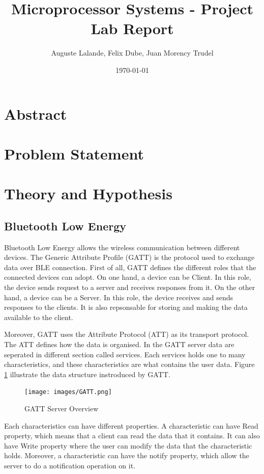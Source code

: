 \documentclass[12pt]{article}
\title{Microprocessor Systems - Project Lab Report}
\author{Auguste Lalande, Felix Dube, Juan Morency Trudel}
\date{\today}
\begin{document}
\maketitle
\clearpage

\tableofcontents
\clearpage

\section{Abstract}

\section{Problem Statement}

\section{Theory and Hypothesis}
\subsection{Bluetooth Low Energy}
Bluetooth Low Energy allows the wireless communication between different devices. The Generic Attribute Profile (GATT) is the protocol used to exchange data over BLE connection. First of all, GATT defines the different roles that the connected devices can adopt. On one hand, a device can be Client. In this role, the device sends request to a server and receives responses from it. On the other hand, a device can be a Server. In this role, the device receives and sends responses to the clients. It is also repsonsable for storing and making the data available to the client.

Moreover, GATT uses the Attribute Protocol (ATT) as its transport protocol. The ATT defines how the data is organised. In the GATT server data are seperated in different section called services. Each services holds one to many characteristics, and these characteristics are what contains the user data. Figure \ref{fig:gatt} illustrate the data structure instroduced by GATT.

\begin{figure}[!htb]
 \centering
 \texttt{[image: images/GATT.png]}
 \caption{GATT Server Overview}
 \label{fig:gatt}
\end{figure}

Each characteristics can have different properties. A characteristic can have Read property, which means that a client can read the data that it contains. It can also have Write property where the user can modify the data that the characteristic holds. Moreover, a characteristic can have the notify property, which allow the server to do a notification operation on it.
\end{document}
